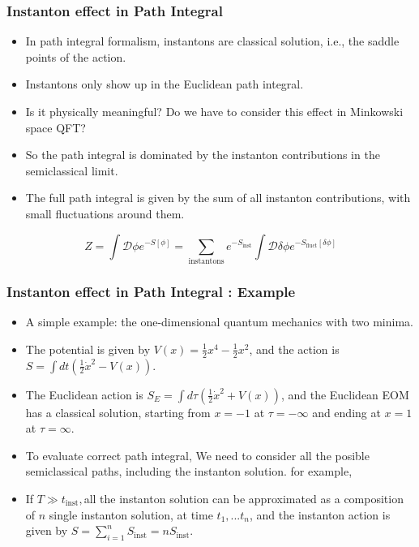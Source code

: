 \documentclass[10pt]{beamer}
\begin{document}
\begin{frame}
\frametitle{Instanton effect in Path Integral}
\begin{itemize}
\item In path integral formalism, instantons are classical solution, i.e., the saddle points of the action.
\item Instantons only show up in the Euclidean path integral.
\item Is it physically meaningful? Do we have to consider this effect in Minkowski space QFT?
\item So the path integral is dominated by the instanton contributions in the semiclassical limit.
\item The full path integral is given by the sum of all instanton contributions, with small fluctuations around them.
\end{itemize}
\begin{equation}
Z = \int \mathcal{D}\phi e^{-S[\phi]} = \sum_{\text{instantons}}  e^{-S_{\text{inst}}} \int \mathcal{D}\delta\phi e^{-S_{\text{fluct}}[\delta\phi]}
\end{equation}
\end{frame}
\begin{frame}
    \frametitle{Instanton effect in Path Integral : Example}
    \begin{itemize}
    \item A simple example: the one-dimensional quantum mechanics with two minima.
    \item The potential is given by $V(x) = \frac{1}{2}x^4 - \frac{1}{2}x^2$, and the action is $S = \int dt \left(\frac{1}{2}\dot{x}^2 - V(x)\right)$.
    \item The Euclidean action is $S_E = \int d\tau \left(\frac{1}{2}\dot{x}^2 + V(x)\right)$, and the Euclidean EOM has a classical solution, starting from $x = -1$ at $\tau = -\infty$ and ending at $x = 1$ at $\tau = \infty$.
    \item To evaluate correct path integral, We need to consider all the posible semiclassical paths, including the instanton solution. for example,
    \item If  $T \gg t_{\text{inst}}, $all the instanton solution can be approximated as a composition of $n$ single instanton solution, at time $t_1, ... t_n$, and the instanton action is given by $S = \sum_{i=1}^n S_{\text{inst}}=nS_{\text{inst}}$.

    \end{itemize}
    
\end{frame}
\end{document}
